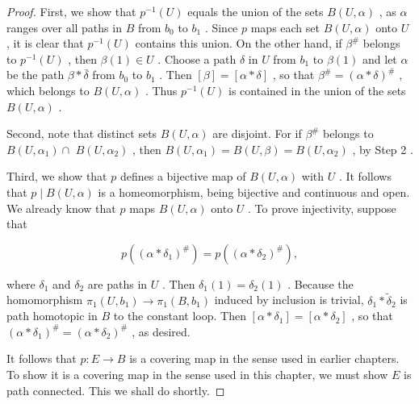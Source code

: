 \begin{proof}
First, we show that \({p}^{-1}\left( U\right)\) equals the union of the sets \(B\left( {U,\alpha }\right)\) , as \(\alpha\) ranges over all paths in \(B\) from \({b}_{0}\) to \({b}_{1}\) . Since \(p\) maps each set \(B\left( {U,\alpha }\right)\) onto \(U\) , it is clear that \({p}^{-1}\left( U\right)\) contains this union. On the other hand, if \({\beta }^{\# }\) belongs to \({p}^{-1}\left( U\right)\) , then \(\beta \left( 1\right)  \in  U\) . Choose a path \(\delta\) in \(U\) from \({b}_{1}\) to \(\beta \left( 1\right)\) and let \(\alpha\) be the path \(\beta  * \bar{\delta }\) from \({b}_{0}\) to \({b}_{1}\) . Then \(\left\lbrack  \beta \right\rbrack = \left\lbrack  {\alpha  * \delta }\right\rbrack\) , so that \({\beta }^{\# } = {\left( \alpha  * \delta \right) }^{\# }\) , which belongs to \(B\left( {U,\alpha }\right)\) . Thus \({p}^{-1}\left( U\right)\) is contained in the union of the sets \(B\left( {U,\alpha }\right)\) .

Second, note that distinct sets \(B\left( {U,\alpha }\right)\) are disjoint. For if \({\beta }^{\# }\) belongs to \(B\left( {U,{\alpha }_{1}}\right)  \cap\)  \(B\left( {U,{\alpha }_{2}}\right)\) , then \(B\left( {U,{\alpha }_{1}}\right)  = B\left( {U,\beta }\right)  = B\left( {U,{\alpha }_{2}}\right)\) , by Step 2 .

Third, we show that \(p\) defines a bijective map of \(B\left( {U,\alpha }\right)\) with \(U\) . It follows that \(p \mid  B\left( {U,\alpha }\right)\) is a homeomorphism, being bijective and continuous and open. We already know that \(p\) maps \(B\left( {U,\alpha }\right)\) onto \(U\) . To prove injectivity, suppose that

\[
p\left( {\left( \alpha  * {\delta }_{1}\right) }^{\# }\right)  = p\left( {\left( \alpha  * {\delta }_{2}\right) }^{\# }\right) ,
\]

where \({\delta }_{1}\) and \({\delta }_{2}\) are paths in \(U\) . Then \({\delta }_{1}\left( 1\right)  = {\delta }_{2}\left( 1\right)\) . Because the homomorphism \({\pi }_{1}\left( {U,{b}_{1}}\right)  \rightarrow  {\pi }_{1}\left( {B,{b}_{1}}\right)\) induced by inclusion is trivial, \({\delta }_{1} * {\widetilde{\delta }}_{2}\) is path homotopic in \(B\) to the constant loop. Then \(\left\lbrack  {\alpha  * {\delta }_{1}}\right\rbrack = \left\lbrack  {\alpha  * {\delta }_{2}}\right\rbrack\) , so that \({\left( \alpha  * {\delta }_{1}\right) }^{\# } = {\left( \alpha  * {\delta }_{2}\right) }^{\# }\) , as desired.

It follows that \(p : E \rightarrow  B\) is a covering map in the sense used in earlier chapters. To show it is a covering map in the sense used in this chapter, we must show \(E\) is path connected. This we shall do shortly.


\end{proof}
